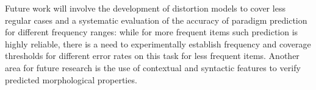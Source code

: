 \documentclass[11pt,a4paper]{article}
\begin{document}
Future work will involve the development of distortion models to cover less regular cases and a systematic evaluation of the accuracy of paradigm prediction for different frequency ranges: while for more frequent items such prediction is highly reliable, there is a need to experimentally establish frequency and coverage thresholds for different error rates on this task for less frequent items. Another area for future research is the use of contextual and syntactic features to verify predicted morphological properties.



\end{document}
